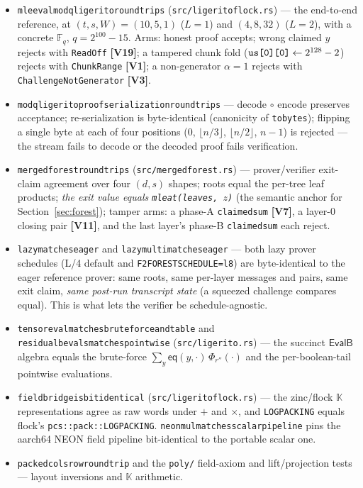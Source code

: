 \documentclass[11pt]{article}
\newcommand{\F}{\mathbb{F}}
\newcommand{\K}{\mathbb{K}}            %
\newcommand{\Fq}{\F_q}                 %
\newcommand{\eq}{\mathsf{eq}}
\newcommand{\code}[1]{{\def\_{\textunderscore\allowbreak}\texttt{#1}}}
\newcommand{\Vc}[1]{\textbf{[V#1]}}    %
\begin{document}
\begin{itemize}[itemsep=2pt]
\item \code{mle\_eval\_mod\_q\_ligerito\_roundtrips}
  (\code{src/ligerito\_flock.rs}) — the end-to-end reference, at
  $(t,s,W) = (10,5,1)$ ($L=1$) and $(4,8,32)$ ($L=2$), with a concrete
  $\Fq$, $q = 2^{100}-15$.  Arms: honest proof accepts; wrong claimed $y$
  rejects with \code{ReadOff} \Vc{19}; a tampered chunk fold
  ($\code{us[0][0]} \leftarrow 2^{128}-2$) rejects with \code{ChunkRange}
  \Vc{1}; a non-generator $\alpha = 1$ rejects with
  \code{ChallengeNotGenerator} \Vc{3}.
\item \code{mod\_q\_ligerito\_proof\_serialization\_roundtrips} — decode
  $\circ$ encode preserves acceptance; re-serialization is byte-identical
  (canonicity of \code{to\_bytes}); flipping a single byte at each of four
  positions ($0$, $\lfloor n/3 \rfloor$, $\lfloor n/2 \rfloor$, $n-1$) is
  rejected — the stream fails to decode or the decoded proof fails
  verification.
\item \code{merged\_forest\_roundtrips} (\code{src/merged\_forest.rs}) —
  prover/verifier exit-claim agreement over four $(d, s)$ shapes; roots
  equal the per-tree leaf products; \emph{the exit value equals
  \code{mle\_at(leaves, $z$)}} (the semantic anchor for
  Section~\ref{sec:forest}); tamper arms: a phase-A \code{claimed\_sum}
  \Vc{7}, a layer-0 closing pair \Vc{11}, and the last layer's phase-B
  \code{claimed\_sum} each reject.
\item \code{lazy\_matches\_eager} and \code{lazy\_multi\_matches\_eager}
  — both lazy prover schedules (L/4 default and
  \code{F2\_FOREST\_SCHEDULE=l8}) are byte-identical to the eager
  reference prover: same roots, same per-layer messages and pairs, same
  exit claim, \emph{same post-run transcript state} (a squeezed challenge
  compares equal).  This is what lets the verifier be schedule-agnostic.
\item \code{tensor\_eval\_matches\_bruteforce\_and\_table} and
  \code{residual\_b\_evals\_matches\_pointwise}
  (\code{src/ligerito.rs}) — the succinct $\mathsf{EvalB}$ algebra equals
  the brute-force $\sum_y \eq(y,\cdot)\,\Phi_{r''}(\cdot)$ and the
  per-boolean-tail pointwise evaluations.
\item \code{field\_bridge\_is\_bit\_identical}
  (\code{src/ligerito\_flock.rs}) — the zinc/flock $\K$ representations
  agree as raw words under $+$ and $\times$, and \code{LOG\_PACKING}
  equals flock's \code{pcs::pack::LOG\_PACKING}.
  \code{neon\_mul\_matches\_scalar\_pipeline} pins the aarch64 NEON field
  pipeline bit-identical to the portable scalar one.
\item \code{packed\_cols\_row\_roundtrip} and the \code{poly/} field-axiom
  and lift/projection tests — layout inversions and $\K$ arithmetic.
\end{itemize}
\end{document}

